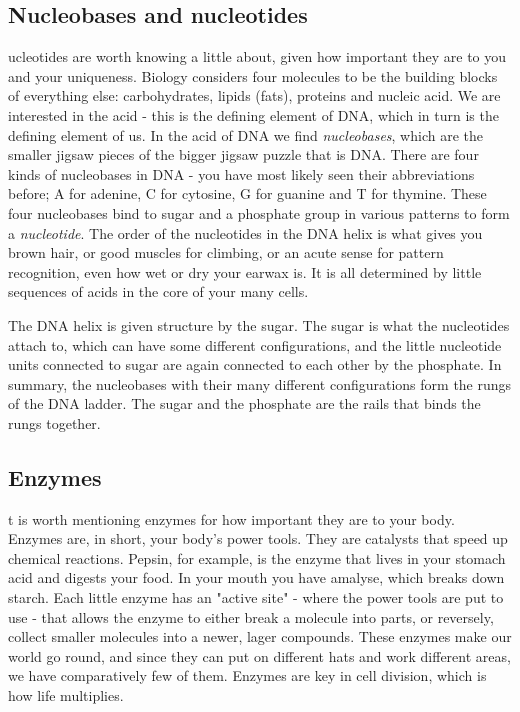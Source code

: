 \subsection{Nucleobases and nucleotides}
ucleotides are worth knowing a little about, given how important they are to you and your uniqueness.
Biology considers four molecules to be the building blocks of everything else: carbohydrates, lipids (fats), proteins and nucleic acid.
We are interested in the acid - this is the defining element of DNA, which in turn is the defining element of us.
In the acid of DNA we find \emph{nucleobases}, which are the smaller jigsaw pieces of the bigger jigsaw puzzle that is DNA.
There are four kinds of nucleobases in DNA - you have most likely seen their abbreviations before; A for adenine, C for cytosine, G for guanine and T for thymine.\cite{hankgreen}
These four nucleobases bind to sugar and a phosphate group in various patterns to form a \emph{nucleotide}.
The order of the nucleotides in the DNA helix is what gives you brown hair, or good muscles for climbing, or an acute sense for pattern recognition, even how wet or dry your earwax is.\cite{hankgreen}
It is all determined by little sequences of acids in the core of your many cells.

The DNA helix is given structure by the sugar.
The sugar is what the nucleotides attach to, which can have some different configurations, and the little nucleotide units connected to sugar are again connected to each other by the phosphate.
In summary, the nucleobases with their many different configurations form the rungs of the DNA ladder.\cite{lewontin}
The sugar and the phosphate are the rails that binds the rungs together.

\subsection{Enzymes}
t is worth mentioning enzymes for how important they are to your body.
Enzymes are, in short, your body's power tools.\cite{hankgreen2}
They are catalysts that speed up chemical reactions.
Pepsin, for example, is the enzyme that lives in your stomach acid and digests your food.
In your mouth you have amalyse, which breaks down starch.
Each little enzyme has an "active site" - where the power tools are put to use - that allows the enzyme to either break a molecule into parts, or reversely, collect smaller molecules into a newer, lager compounds.
These enzymes make our world go round, and since they can put on different hats and work different areas, we have comparatively few of them.
Enzymes are key in cell division, which is how life multiplies. 


